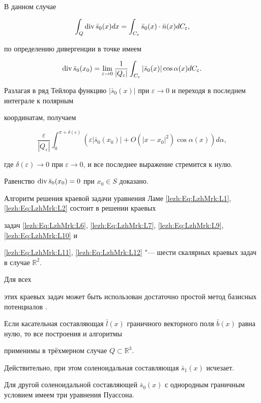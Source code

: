 В данном случае

\[

   \int_Q \text{div\,} \bar{s}_0(x) dx = \int_{C_{\varepsilon}} \bar{s}_0(x) \cdot \bar{n}(x) d C_\varepsilon,

\]

по определению дивергенции в точке имеем

\[

   \text{div\,}  \bar{s}_0 (x_0) = \lim_{\varepsilon \rightarrow 0} \frac{1}{\left| Q_\varepsilon \right|}

    \int_{C_\varepsilon} \left| \bar{s}_0 (x) \right| \cos \alpha(x) d C_\varepsilon.

\]



Разлагая в ряд Тейлора функцию $| \bar{s}_0(x) |$ при $\varepsilon \to 0$ и переходя в последнем интеграле к полярным

координатам, получаем

\[

   \frac{\varepsilon}{\left| Q_\varepsilon \right|} \int^{\pi+\delta(\varepsilon)}_{0} \left( \varepsilon \left| \bar{s}_{0}(x_0) \right|

    + O(\left|x-x_{0}\right|^{2}) \cos \alpha(x) \right)  d \alpha,

\]

где $ \delta(\varepsilon) \to 0 $ при $\varepsilon \to 0$, и все последнее выражение стремится к нулю. 

Равенство $\text{div\,} \bar{s}_0 (x_0) = 0$ при $x_0 \in S$ доказано.



Алгоритм решения краевой задачи уравнения Ламе \eqref{lezh:Eq:LzhMrk:L1}, \eqref{lezh:Eq:LzhMrk:L2} состоит в решении краевых

задач \eqref{lezh:Eq:LzhMrk:L6}, \eqref{lezh:Eq:LzhMrk:L7}, \eqref{lezh:Eq:LzhMrk:L9}, \eqref{lezh:Eq:LzhMrk:L10} и

\eqref{lezh:Eq:LzhMrk:L11}, \eqref{lezh:Eq:LzhMrk:L12} "--- шести скалярных краевых задач в случае $\mathbb{R}^{2}$. 

Для всех 

этих краевых задач может быть использован достаточно простой метод базисных потенциалов \cite{lezh:LzhMrk:bib:LM}.



\begin{remark}[1]

Если касательная составляющая $\bar{l}(x)$ граничного векторного поля $\bar{b}(x)$ равна нулю, то все построения и алгоритмы

применимы в трёхмерном случае $Q \subset \mathbb{R}^3$. 

Действительно, при этом соленоидальная составляющая $\bar{s}_{1}(x)$ исчезает. 

Для другой соленоидальной составляющей $\bar{s}_0(x)$ с однородным граничным условием имеем три уравнения Пуассона.

\end{remark}



